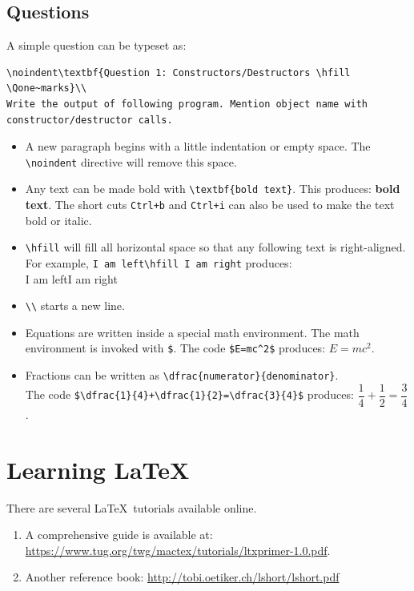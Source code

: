 \documentclass[12pt,a4paper]{article}
\def\Qone{5}
\begin{document}
\subsection{Questions}
A simple question can be typeset as:
\begin{lstlisting}
\noindent\textbf{Question 1: Constructors/Destructors \hfill \Qone~marks}\\
Write the output of following program. Mention object name with constructor/destructor calls.
\end{lstlisting}
\begin{itemize}
\itemsep0em
\item A new paragraph begins with a little indentation or empty space. The \verb|\noindent| directive will remove this space.
\item Any text can be made bold with \verb|\textbf{bold text}|. This produces: \textbf{bold text}. The short cuts \verb|Ctrl+b| and \verb|Ctrl+i| can also be used to make the text bold or italic.
\item \verb|\hfill| will fill all horizontal space so that any following text is right-aligned. For example, \verb|I am left\hfill I am right| produces:\\I am left\hfill I am right
\item \verb|\\| starts a new line.
\item Equations are written inside a special math environment. The math environment is invoked with \verb|$|. The code \verb|$E=mc^2$| produces: $E=mc^2$.
\item Fractions can be written as \verb|\dfrac{numerator}{denominator}|.\\The code \verb|$\dfrac{1}{4}+\dfrac{1}{2}=\dfrac{3}{4}$| produces: $\dfrac{1}{4}+\dfrac{1}{2}=\dfrac{3}{4}$.
\end{itemize}
\section{Learning \LaTeX}
There are several \LaTeX~tutorials available online.
\begin{enumerate}
\item A comprehensive guide is available at: \url{https://www.tug.org/twg/mactex/tutorials/ltxprimer-1.0.pdf}.
\item Another reference book: \url{http://tobi.oetiker.ch/lshort/lshort.pdf}
\end{enumerate}
%
%
\end{document}

